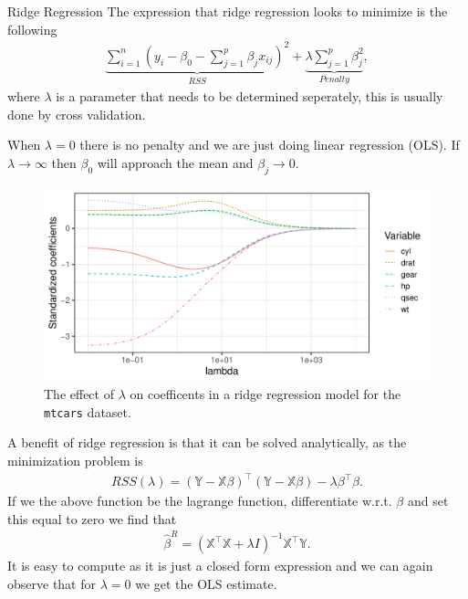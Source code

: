 \documentclass[aspectratio=169,10pt]{beamer}
\begin{document}
\begin{frame}{\secname}{Ridge Regression}
  The expression that ridge regression looks to minimize is the following
  \begin{align}\label{eq:ridge.regression}
    \underbrace{\sum_{i =1}^n \left(y_i - \beta_0 - \sum_{j=1}^p \beta_j x_{ij} \right)^2}_{RSS} + \underbrace{\lambda\sum_{j=1}^p \beta_j^2}_{Penalty}, 
  \end{align}
  where $\lambda$ is a parameter that needs to be determined seperately, this is usually done by cross validation.

  When $\lambda = 0$ there is no penalty and we are just doing linear regression (OLS).
  If $\lambda \rightarrow \infty$ then $\beta_0$ will approach the mean and $\beta_j \rightarrow 0$.
\end{frame}

\begin{frame}{\secname}{\subsecname}
  \begin{figure}
    \includegraphics[width=.7\textwidth]{scripts/output/ridge_coefficient.pdf}
    \caption{The effect of $\lambda$ on coefficents in a ridge regression model for the \texttt{mtcars} dataset.}
  \end{figure}
\end{frame}

\begin{frame}{\secname}{\subsecname}
  A benefit of ridge regression is that it can be solved analytically, as the minimization problem is
  \begin{align}
    RSS(\lambda) = (\mathbb{Y} - \mathbb{X}\beta)^\top(\mathbb{Y} - \mathbb{X}\beta) - \lambda\beta^\top\beta.
  \end{align}
  If we the above function be the lagrange function, differentiate w.r.t.\! $\beta$ and set this equal to zero we find that
  \begin{align}
    \hat{\beta}^R = (\mathbb{X}^\top\mathbb{X} + \lambda I)^{-1}\mathbb{X}^\top\mathbb{Y}.
  \end{align}
  It is easy to compute as it is just a closed form expression and we can again observe that for $\lambda = 0$ we get the OLS estimate.
\end{frame}
\end{document}
